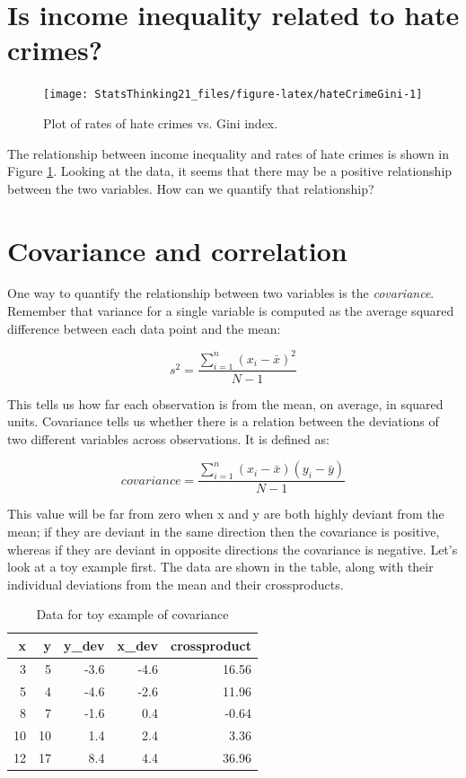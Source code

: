 \documentclass[12pt,]{book}
\theoremstyle{definition}
\theoremstyle{definition}
\theoremstyle{definition}
\theoremstyle{remark}
\begin{document}
\hypertarget{is-income-inequality-related-to-hate-crimes}{%
\section{Is income inequality related to hate crimes?}\label{is-income-inequality-related-to-hate-crimes}}

\begin{figure}
\texttt{[image: StatsThinking21\_files/figure-latex/hateCrimeGini-1]} \caption{Plot of rates of hate crimes vs. Gini index.}\label{fig:hateCrimeGini}
\end{figure}

The relationship between income inequality and rates of hate crimes is shown in Figure \ref{fig:hateCrimeGini}.
Looking at the data, it seems that there may be a positive relationship between the two variables. How can we quantify that relationship?

\hypertarget{covariance-and-correlation}{%
\section{Covariance and correlation}\label{covariance-and-correlation}}

One way to quantify the relationship between two variables is the \emph{covariance}. Remember that variance for a single variable is computed as the average squared difference between each data point and the mean:

\[
s^2 = \frac{\sum_{i=1}^n (x_i - \bar{x})^2}{N - 1}
\]

This tells us how far each observation is from the mean, on average, in squared units. Covariance tells us whether there is a relation between the deviations of two different variables across observations. It is defined as:

\[
covariance = \frac{\sum_{i=1}^n (x_i - \bar{x})(y_i - \bar{y})}{N - 1}
\]

This value will be far from zero when x and y are both highly deviant from the mean; if they are deviant in the same direction then the covariance is positive, whereas if they are deviant in opposite directions the covariance is negative. Let's look at a toy example first. The data are shown in the table, along with their individual deviations from the mean and their crossproducts.

\begin{table}

\caption{\label{tab:unnamed-chunk-91}Data for toy example of covariance}
\centering
\begin{tabular}[t]{r|r|r|r|r}
\hline
x & y & y\_dev & x\_dev & crossproduct\\
\hline
3 & 5 & -3.6 & -4.6 & 16.56\\
\hline
5 & 4 & -4.6 & -2.6 & 11.96\\
\hline
8 & 7 & -1.6 & 0.4 & -0.64\\
\hline
10 & 10 & 1.4 & 2.4 & 3.36\\
\hline
12 & 17 & 8.4 & 4.4 & 36.96\\
\hline
\end{tabular}
\end{table}
\end{document}
